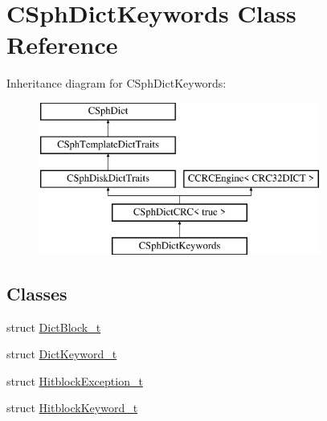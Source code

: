 \hypertarget{classCSphDictKeywords}{\section{C\-Sph\-Dict\-Keywords Class Reference}
\label{classCSphDictKeywords}
}
Inheritance diagram for C\-Sph\-Dict\-Keywords\-:\begin{figure}[H]
\begin{center}
\leavevmode
\includegraphics[height=5.000000cm]{classCSphDictKeywords}
\end{center}
\end{figure}
\subsection*{Classes}
\begin{DoxyCompactItemize}
\item 
struct \hyperlink{structCSphDictKeywords_1_1DictBlock__t}{Dict\-Block\-\_\-t}
\item 
struct \hyperlink{structCSphDictKeywords_1_1DictKeyword__t}{Dict\-Keyword\-\_\-t}
\item 
struct \hyperlink{structCSphDictKeywords_1_1HitblockException__t}{Hitblock\-Exception\-\_\-t}
\item 
struct \hyperlink{structCSphDictKeywords_1_1HitblockKeyword__t}{Hitblock\-Keyword\-\_\-t}
\end{DoxyCompactItemize}
